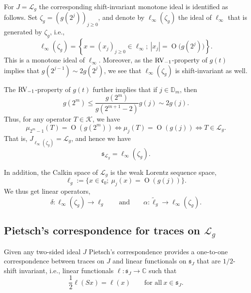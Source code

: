 \documentclass[10pt, a4paper]{amsart}
\newcommand{\C}{\mathbb{C}}
\newcommand{\D}{\mathbb{D}}
\newcommand{\sL}{\mathscr{L}}
\newcommand{\sK}{\mathscr{K}}
\newcommand{\fs}{\mathfrak{s}}
\newcommand{\co}{\mathfrak{c}_{0}}
\newcommand{\op}{\operatorname}
\numberwithin{equation}{section}
\theoremstyle{definition}
\theoremstyle{remark}
\newcommand{\RV}{\textup{RV}}
\begin{document}
For $J=\sL_g$ the corresponding shift-invariant monotone ideal is identified as follows. Set $\zeta_g= (g(2^{j}))_{j\geq 0}$, and denote by $\ell_\infty(\zeta_g)$ the ideal of $\ell_\infty$ that is generated by $\zeta_g$, i.e.,
\begin{equation*}
 \ell_\infty(\zeta_g)=\left\{x=(x_j)_{j\geq 0}\in \ell_\infty; \ |x_j|=\op{O}\big(g(2^j)\big)\right\}.
\end{equation*}
This is a monotone ideal of $\ell_\infty$. Moreover, as the $\RV_{-1}$-property of $g(t)$ implies that $g(2^{j-1})\sim 2 g(2^j)$, we see that $\ell_\infty(\zeta_g)$ is shift-invariant as well.

The $\RV_{-1}$-property of $g(t)$ further implies that if $j\in\D_m$, then
\begin{equation*}
 g(2^m)\leq \frac{g(2^m)}{g(2^{m+1}-2)}g(j)\sim 2g(j).
\end{equation*}
Thus, for any operator $T\in \sK$, we have
\begin{equation*}
 \mu_{2^m-1}(T) =\op{O}(g(2^m)) \Longleftrightarrow \mu_j(T)=\op{O}(g(j))  \Longleftrightarrow T\in \sL_g.
\end{equation*}
That is, $J_{\ell_\infty(\zeta_g)}=\sL_g$, and hence we have
\begin{equation*}
 \fs_{\sL_g}=\ell_\infty(\zeta_g).
\end{equation*}

In addition, the Calkin space of $\sL_g$ is the weak Lorentz sequence space,
\begin{equation*}
 \ell_g:=\big\{ x\in \co; \ \mu_j(x)= \op{O}(g(j))\big\}.
\end{equation*}
We thus get linear operators,
\begin{equation*}
 \delta:\ell_\infty(\zeta_g) \longrightarrow \ell_g \qquad \text{and} \qquad \alpha:\tilde{\ell}_g \longrightarrow \ell_\infty(\zeta_g).
\end{equation*}

\subsection{Pietsch's correspondence for traces on $\sL_g$}
Given any two-sided ideal $J$ Pietsch's correspondence provides a one-to-one correspondence between traces on $J$ and linear functionals on $\fs_J$ that are $1/2$-shift invariant, i.e., linear functionals $\ell:\fs_J\rightarrow \C$ such that
\begin{equation*}
\frac12 \ell(Sx)=\ell(x) \qquad \text{for all}\ x\in \fs_J.
\end{equation*}
\end{document}
